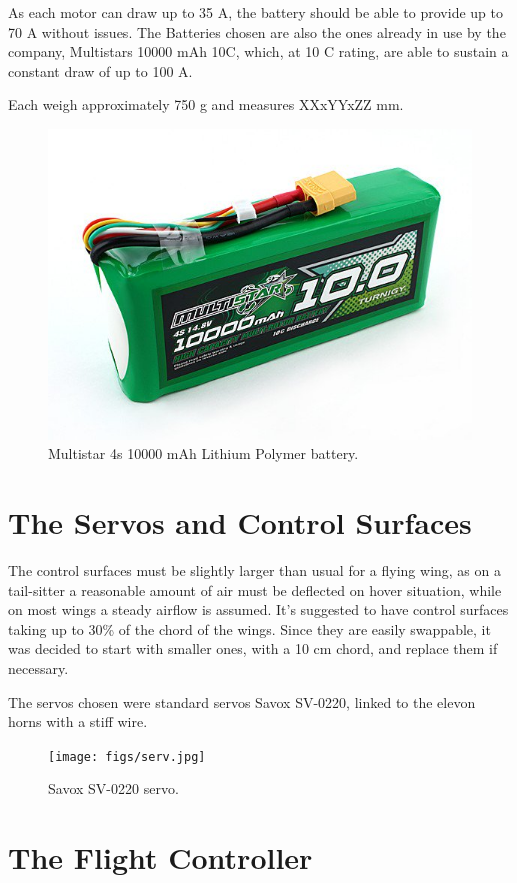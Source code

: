 As each motor can draw up to 35 A, the battery should be able to provide up to 70 A without issues.
The Batteries chosen are also the ones already in use by the company, Multistars 10000 mAh 10C, which, at 10 C rating, are able to sustain a constant draw of up to 100 A. 

Each weigh approximately 750 g and measures XXxYYxZZ mm.

\begin{figure}[H]
\centering
  \includegraphics[width=0.8\linewidth]{figs/battery.jpg}
  \caption{Multistar 4s 10000 mAh Lithium Polymer battery.}
  \label{fig:yaw_loop}
\end{figure}


\section{The Servos and Control Surfaces}

The control surfaces must be slightly larger than usual for a flying wing, as on a tail-sitter a reasonable amount of air must be deflected on hover situation, while on most wings a steady airflow is assumed. It's suggested to have control surfaces taking up to 30\% of the chord of the wings. Since they are easily swappable, it was decided to start with smaller ones, with a 10 cm chord, and replace them if necessary.


The servos chosen were standard servos Savox SV-0220, linked to the elevon horns with a stiff wire.

\begin{figure}[H]
\centering
  \texttt{[image: figs/serv.jpg]}
  \caption{Savox SV-0220 servo.}
  \label{fig:yaw_loop}
\end{figure}

\section{The Flight Controller}

